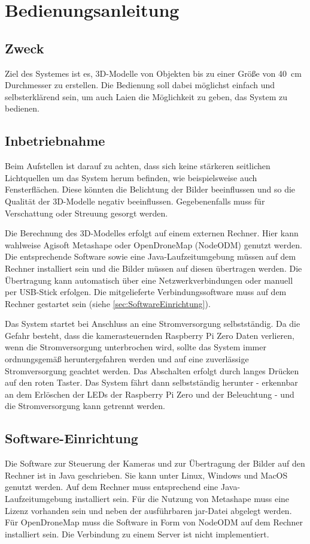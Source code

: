 \documentclass[./00PhotoBox.tex]{subfiles}
\begin{document}
\chapter{Bedienungsanleitung}

\section{Zweck}
Ziel des Systemes ist es, 3D-Modelle von Objekten bis zu einer Größe von 40~cm Durchmesser zu erstellen. Die Bedienung soll dabei möglichst einfach und selbsterklärend sein, um auch Laien die Möglichkeit zu geben, das System zu bedienen.

\section{Inbetriebnahme}
Beim Aufstellen ist darauf zu achten, dass sich keine stärkeren seitlichen Lichtquellen um das System herum befinden, wie beispielsweise auch Fensterflächen. Diese könnten die Belichtung der Bilder beeinflussen und so die Qualität der 3D-Modelle negativ beeinflussen. Gegebenenfalls muss für Verschattung oder Streuung gesorgt werden.

Die Berechnung des 3D-Modelles erfolgt auf einem externen Rechner. Hier kann wahlweise Agisoft Metashape oder OpenDroneMap (NodeODM) genutzt werden. Die entsprechende Software sowie eine Java-Laufzeitumgebung müssen auf dem Rechner installiert sein und die Bilder müssen auf diesen übertragen werden. Die Übertragung kann automatisch über eine Netzwerkverbindungen oder manuell per USB-Stick erfolgen. Die mitgelieferte Verbindungssoftware muss auf dem Rechner gestartet sein (siehe \autoref{sec:SoftwareEinrichtung}).

Das System startet bei Anschluss an eine Stromversorgung selbstständig. Da die Gefahr besteht, dass die kamerasteuernden Raspberry Pi Zero Daten verlieren, wenn die Stromversorgung unterbrochen wird, sollte das System immer ordnungsgemäß heruntergefahren werden und auf eine zuverlässige Stromversorgung geachtet werden.
Das Abschalten erfolgt durch langes Drücken auf den roten Taster. Das System fährt dann selbstständig herunter - erkennbar an dem Erlöschen der LEDs der Raspberry Pi Zero und der Beleuchtung - und die Stromversorgung kann getrennt werden.

\section{Software-Einrichtung}
\label{sec:SoftwareEinrichtung}
Die Software zur Steuerung der Kameras und zur Übertragung der Bilder auf den Rechner ist in Java geschrieben. Sie kann unter Linux, Windows und MacOS genutzt werden. Auf dem Rechner muss entsprechend eine Java-Laufzeitumgebung installiert sein. Für die Nutzung von Metashape muss eine Lizenz vorhanden sein und neben der ausführbaren jar-Datei abgelegt werden. Für OpenDroneMap muss die Software in Form von NodeODM auf dem Rechner installiert sein. Die Verbindung zu einem Server ist nicht implementiert.
\end{document}
